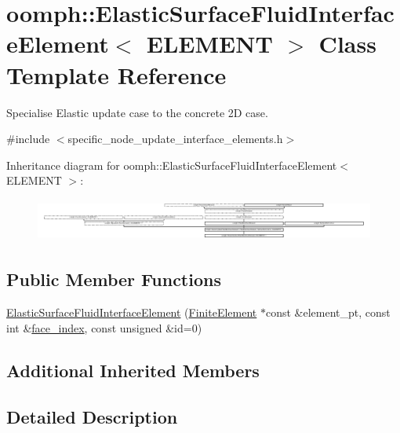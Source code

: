 \hypertarget{classoomph_1_1ElasticSurfaceFluidInterfaceElement}{}\section{oomph\+:\+:Elastic\+Surface\+Fluid\+Interface\+Element$<$ E\+L\+E\+M\+E\+NT $>$ Class Template Reference}
\label{classoomph_1_1ElasticSurfaceFluidInterfaceElement}


Specialise Elastic update case to the concrete 2D case.  




{\ttfamily \#include $<$specific\+\_\+node\+\_\+update\+\_\+interface\+\_\+elements.\+h$>$}

Inheritance diagram for oomph\+:\+:Elastic\+Surface\+Fluid\+Interface\+Element$<$ E\+L\+E\+M\+E\+NT $>$\+:\begin{figure}[H]
\begin{center}
\leavevmode
\includegraphics[height=1.418919cm]{classoomph_1_1ElasticSurfaceFluidInterfaceElement}
\end{center}
\end{figure}
\subsection*{Public Member Functions}
\begin{DoxyCompactItemize}
\item 
\hyperlink{classoomph_1_1ElasticSurfaceFluidInterfaceElement_aa2add34e23b16990c7000d699bc395e2}{Elastic\+Surface\+Fluid\+Interface\+Element} (\hyperlink{classoomph_1_1FiniteElement}{Finite\+Element} $\ast$const \&element\+\_\+pt, const int \&\hyperlink{classoomph_1_1FaceElement_a478d577ac6db67ecc80f1f02ae3ab170}{face\+\_\+index}, const unsigned \&id=0)
\end{DoxyCompactItemize}
\subsection*{Additional Inherited Members}


\subsection{Detailed Description}
